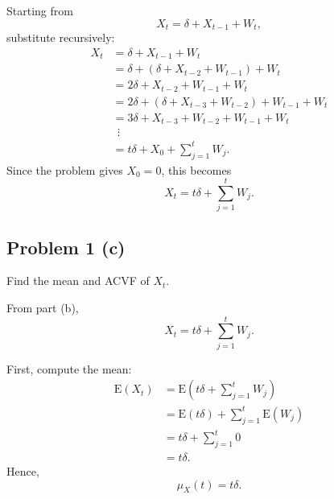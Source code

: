\documentclass[
  10pt,
]{extarticle}
\begin{document}
Starting from
\[
X_t = \delta + X_{t-1} + W_t,
\]
substitute recursively:
\[
\begin{aligned}
X_t
&= \delta + X_{t-1} + W_t \\
&= \delta + (\delta + X_{t-2} + W_{t-1}) + W_t \\
&= 2\delta + X_{t-2} + W_{t-1} + W_t \\
&= 2\delta + (\delta + X_{t-3} + W_{t-2}) + W_{t-1} + W_t \\
&= 3\delta + X_{t-3} + W_{t-2} + W_{t-1} + W_t \\
&\ \ \vdots \\
&= t\delta + X_0 + \sum_{j=1}^{t} W_j.
\end{aligned}
\]
Since the problem gives \(X_0=0\), this becomes
\[
X_t = t\delta + \sum_{j=1}^{t} W_j.
\]

\newpage

\subsection{Problem 1 (c)}\label{problem-1-c}

\begin{problem}[Problem 1 (c)]
Find the mean and ACVF of \(X_t\).
\end{problem}

From part (b),
\[
X_t = t\delta + \sum_{j=1}^{t} W_j.
\]

First, compute the mean:
\[
\begin{aligned}
\mathrm{E}(X_t)
&= \mathrm{E}\left(t\delta + \sum_{j=1}^{t} W_j\right) \\
&= \mathrm{E}(t\delta) + \sum_{j=1}^{t} \mathrm{E}(W_j) \\
&= t\delta + \sum_{j=1}^{t} 0 \\
&= t\delta.
\end{aligned}
\]
Hence,
\[
\mu_X(t) = t\delta.
\]
\end{document}
